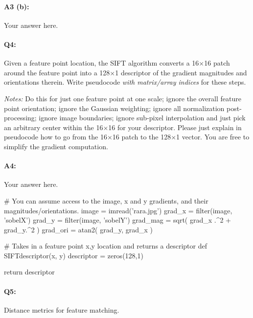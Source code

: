 \paragraph{A3 (b):} Your answer here.






\pagebreak
\paragraph{Q4:} Given a feature point location, the SIFT algorithm converts a 16$\times$16 patch around the feature point into a 128$\times$1 descriptor of the gradient magnitudes and orientations therein. Write pseudocode \emph{with matrix/array indices} for these steps.

\emph{Notes:} Do this for just one feature point at one scale; ignore the overall feature point orientation; ignore the Gaussian weighting; ignore all normalization post-processing; ignore image boundaries; ignore sub-pixel interpolation and just pick an arbitrary center within the 16$\times$16 for your descriptor. Please just explain in pseudocode how to go from the 16$\times$16 patch to the 128$\times$1 vector. You are free to simplify the gradient computation.

\paragraph{A4:} Your answer here.

\begin{python}
# You can assume access to the image, x and y gradients, and their magnitudes/orientations.
image = imread('rara.jpg')
grad_x = filter(image, 'sobelX')
grad_y = filter(image, 'sobelY')
grad_mag = sqrt( grad_x .^2 + grad_y.^2 )
grad_ori = atan2( grad_y, grad_x )

# Takes in a feature point x,y location and returns a descriptor
def SIFTdescriptor(x, y)
    descriptor = zeros(128,1)


    return descriptor
\end{python}





\pagebreak
\paragraph{Q5:} Distance metrics for feature matching.

